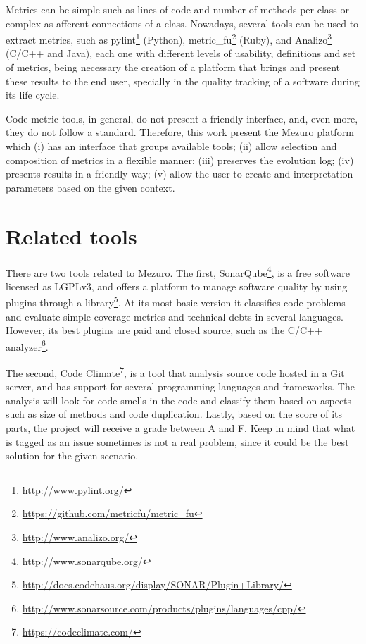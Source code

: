 \documentclass{llncs}
\begin{document}
Metrics can be simple such as lines of code and number of methods per class or
complex as afferent connections of a class. Nowadays, several tools can be
used to extract metrics, such as
pylint\footnote{\url{http://www.pylint.org/}} (Python),
metric\_fu\footnote{\url{https://github.com/metricfu/metric_fu}} (Ruby), and
Analizo\footnote{\url{http://www.analizo.org/}} (C/C++ and Java), each one with
different levels of usability, definitions and set of metrics, being necessary
the creation of a platform that brings and present these results to the end
user, specially in the quality tracking of a software during its life cycle.

Code metric tools, in general, do not present a friendly interface, and,
even more, they do not follow a standard. Therefore, this work present the
Mezuro platform which (i) has an interface that groups available tools;
(ii) allow selection and composition of metrics in a flexible manner;
(iii) preserves the evolution log;
(iv) presents results in a friendly way;
(v) allow the user to create and interpretation parameters based on the given
context.

\section{Related tools}

There are two tools related to Mezuro. The first, SonarQube\footnote{\url{http://www.sonarqube.org/}}, is a free software licensed as LGPLv3, and offers a platform to manage software quality by using plugins through a 
library\footnote{\url{http://docs.codehaus.org/display/SONAR/Plugin+Library/}}.
At its most basic version it classifies code problems and evaluate simple
coverage metrics and technical debts in several languages. However, its best
plugins are paid and closed source, such as the
C/C++ analyzer\footnote{\url{http://www.sonarsource.com/products/plugins/languages/cpp/}}.

The second, Code Climate\footnote{\url{https://codeclimate.com/}}, is a tool
that analysis source code hosted in a Git server, and has support for several
programming languages and frameworks. The analysis will look for code smells
in the code and classify them based on aspects such as size of methods and
code duplication. Lastly, based on the score of its parts, the project will
receive a grade between A and F. Keep in mind that what is tagged as an issue
sometimes is not a real problem, since it could be the best solution for the
given scenario.
\end{document}
